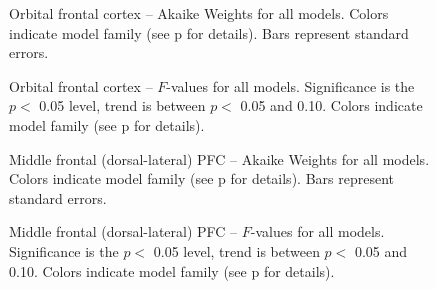 \documentclass[doc,12pt]{apa}        %
\begin{document}
\begin{figure}[tp]
    \centering
    \caption{Orbital frontal cortex -- Akaike Weights for all models.  Colors indicate model family (see p\pageref{sub:cmb} for details). Bars represent standard errors.}
	\label{fig:ofc}
\end{figure}
\begin{figure}[tp]
    \centering
    \caption{Orbital frontal cortex -- $F$-values for all models.  Significance is the $p <$ 0.05 level, trend is between $p <$ 0.05 and 0.10.  Colors indicate model family (see p\pageref{sub:cmb} for details).}
	\label{fig:fvalofc}
\end{figure}


\begin{figure}[tp]
    \centering
    \caption{Middle frontal (dorsal-lateral) PFC -- Akaike Weights for all models.  Colors indicate model family (see p\pageref{sub:cmb} for details). Bars represent standard errors.}
	\label{fig:dlpfc}
\end{figure}
\begin{figure}[tp]
    \centering
    \caption{Middle frontal (dorsal-lateral) PFC -- $F$-values for all models.  Significance is the $p <$ 0.05 level, trend is between $p <$ 0.05 and 0.10.  Colors indicate model family (see p\pageref{sub:cmb} for details).}
	\label{fig:fvaldlpfc}
\end{figure}

\clearpage
\newpage

\end{document}
